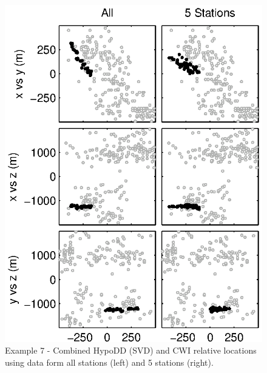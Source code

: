 \documentclass[extra, onecolumn, doublespacing]{gji}
\begin{document}
\begin{figure}
\includegraphics{Figure11_bw.eps}
\caption{Example 7 - Combined HypoDD (SVD) and CWI relative
locations using data form all stations (left) and 5 stations
(right).} \label{fig-68Calaverasevents_ttandcoda1}
\end{figure}



\end{document}
